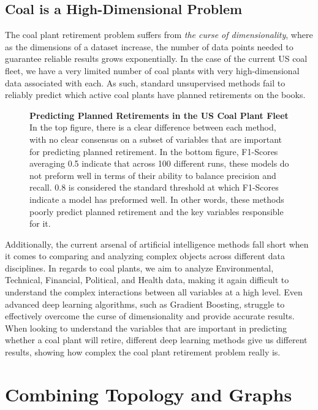 \documentclass{article}
\begin{document}
\subsection{Coal is a High-Dimensional Problem}

The coal plant retirement problem suffers from \textit{the curse of dimensionality}, where as the dimensions of a dataset increase, the number of data points needed to guarantee reliable results grows exponentially. In the case of the current US coal fleet, we have a very limited number of coal plants with very high-dimensional data associated with each. As such, standard unsupervised methods fail to reliably predict which active coal plants have planned retirements on the books.

\begin{figure}[H]
    
    
    \label{fig:2}
    \caption{\textbf{Predicting Planned Retirements in the US Coal Plant Fleet} In the top figure, there is a clear difference between each method, with no clear consensus on a subset of variables that are important for predicting planned retirement. In the bottom figure, F1-Scores averaging 0.5 indicate that across 100 different runs, these models do not preform well in terms of their ability to balance precision and recall. 0.8 is considered the standard threshold at which F1-Scores indicate a model has preformed well. In other words, these methods poorly predict planned retirement and the key variables responsible for it.}
\end{figure}

Additionally, the current arsenal of artificial intelligence methods fall short when it comes to comparing and analyzing complex objects across different data disciplines. In regards to coal plants, we aim to analyze Environmental, Technical, Financial, Political, and Health data, making it again difficult to understand the complex interactions between all variables at a high level. Even advanced deep learning algorithms, such as Gradient Boosting, struggle to effectively overcome the curse of dimensionality and provide accurate results. When looking to understand the variables that are important in predicting whether a coal plant will retire, different deep learning methods give us different results, showing how complex the coal plant retirement problem really is.

\section{Combining Topology and Graphs}
\end{document}
